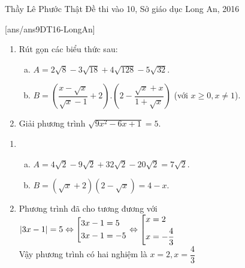 \begin{name}
{Thầy  Lê Phước Thật}
{Đề thi vào 10, Sở giáo dục Long An, 2016}
\end{name}
\setcounter{ex}{0}
[ans/ans9DT16-LongAn]
\begin{ex}%
\hfill
\begin{enumerate}[1)]
	\item Rút gọn các biểu thức sau:
	\begin{enumerate}[a)]
		\item $A=2\sqrt{8}-3\sqrt{18}+4\sqrt{128}-5\sqrt{32}$.
		\item $B=\left(\dfrac{x-\sqrt{x}}{\sqrt{x}-1}+2\right).\left(2-\dfrac{\sqrt{x}+x}{1+\sqrt{x}}\right)$ (với $x \ge 0, x \neq 1$).
	\end{enumerate}
\item Giải phương trình $\sqrt{9x^2-6x+1}=5$.
\end{enumerate}

\loigiai
{\begin{enumerate}[1)]
		\item    
		\begin{enumerate}[a)]
			\item $A=4\sqrt{2}-9\sqrt{2}+32\sqrt{2}-20\sqrt{2}=7\sqrt{2}$.
			\item $B=\left(\sqrt{x}+2\right)\left(2-\sqrt{x}\right)=4-x$.
		\end{enumerate}
	\item Phương trình đã cho tương đương với\\
	$|3x-1|=5 \Leftrightarrow \left[\begin{aligned}&3x-1=5\\&3x-1=-5\end{aligned}\right. \Leftrightarrow \left[\begin{aligned}&x=2\\&x=-\dfrac{4}{3}\end{aligned}\right.$\\
	Vậy phương trình có hai nghiệm là $x=2, x=\dfrac{4}{3}$
	\end{enumerate}

 
    }
    
\end{ex}

